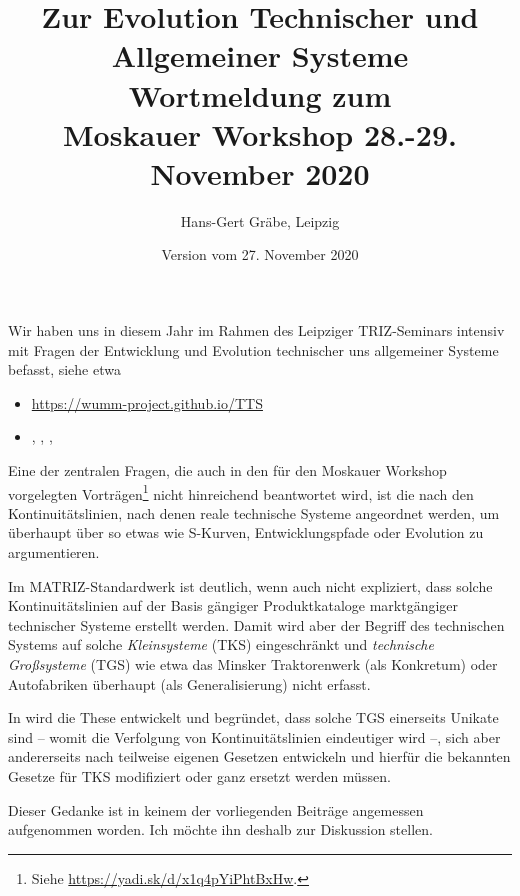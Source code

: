\documentclass[11pt,a4paper]{article}
\title{Zur Evolution Technischer und Allgemeiner Systeme\\[1em] \Large
  Wortmeldung zum\\ Moskauer Workshop 28.-29. November 2020}
\author{Hans-Gert Gräbe, Leipzig}
\date{Version vom 27. November 2020}
\begin{document}
\maketitle

Wir haben uns in diesem Jahr im Rahmen des Leipziger TRIZ-Seminars intensiv
mit Fragen der Entwicklung und Evolution technischer uns allgemeiner Systeme
befasst, siehe etwa
\begin{itemize}[noitemsep]
\item \url{https://wumm-project.github.io/TTS}
\item \cite{Graebe2020a}, \cite{Graebe2020b}, \cite{Graebe2020c},
  \cite{Graebe2020d}
\end{itemize}

Eine der zentralen Fragen, die auch in den für den Moskauer Workshop
vorgelegten Vorträgen\footnote{Siehe \url{https://yadi.sk/d/x1q4pYiPhtBxHw}.}
nicht hinreichend beantwortet wird, ist die nach den Kontinuitätslinien, nach
denen reale technische Systeme angeordnet werden, um überhaupt über so etwas
wie S-Kurven, Entwicklungspfade oder Evolution zu argumentieren.

Im MATRIZ-Standardwerk \cite{TESE2018} ist deutlich, wenn auch nicht
expliziert, dass solche Kontinuitätslinien auf der Basis gängiger
Produktkataloge marktgängiger technischer Systeme erstellt werden.  Damit wird
aber der Begriff des technischen Systems auf solche \emph{Kleinsysteme} (TKS)
eingeschränkt und \emph{technische Großsysteme} (TGS) wie etwa das Minsker
Traktorenwerk (als Konkretum) oder Autofabriken überhaupt (als
Generalisierung) nicht erfasst.

In \cite{Graebe2020b} wird die These entwickelt und begründet, dass solche TGS
einerseits Unikate sind -- womit die Verfolgung von Kontinuitätslinien
eindeutiger wird --, sich aber andererseits nach teilweise eigenen Gesetzen
entwickeln und hierfür die bekannten Gesetze für TKS modifiziert oder ganz
ersetzt werden müssen.

Dieser Gedanke ist in keinem der vorliegenden Beiträge angemessen aufgenommen
worden. Ich möchte ihn deshalb zur Diskussion stellen.
\end{document}

